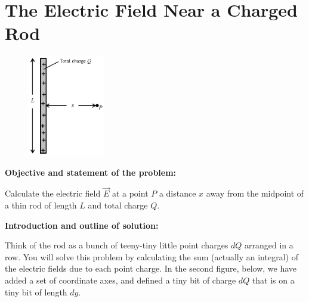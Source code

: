 \section{The Electric Field Near a Charged Rod}

\makelabheader %

\begin{figure}
\vspace{-.25in}
    \includegraphics[width=0.3\textwidth]{electric_field_near_a_charged_rod/fig1.eps}
\end{figure}

\vspace{1cm}

\textbf{Objective and statement of the problem:}

Calculate the electric field $\vec{E}$ at a point $P$ a distance $x$ away from the midpoint of a thin rod
of length $L$ and total charge $Q$.

\vspace{1cm}

\textbf{Introduction and outline of solution:}

Think of the rod as a bunch of teeny-tiny little point charges $dQ$ arranged in a row. You will solve this problem by calculating the sum (actually an integral) of the electric fields due to each point charge.  In the second figure, below, we have added a set of coordinate axes, and defined a tiny bit of charge $dQ$ that is on a tiny bit of length $dy$.  
\par

